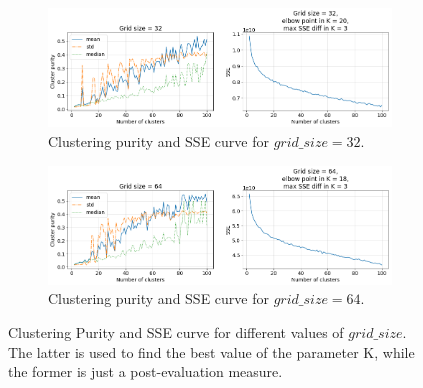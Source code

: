 \documentclass[12pt, twoside, a4paper]{report}
\begin{document}
\begin{figure}\ContinuedFloat
\begin{subfigure}[b]{\linewidth}
\includegraphics[width=\linewidth]{images/purity/32by32.png} 
\caption{Clustering purity and SSE curve for $grid\_size = 32$.}
\label{subfig:purity-32}
\end{subfigure}


\begin{subfigure}[b]{\linewidth}
\includegraphics[width=\linewidth]{images/purity/64by64.png} 
\caption{Clustering purity and SSE curve for $grid\_size = 64$.}
\label{subfig:purity-64}
\end{subfigure}
\caption{Clustering Purity and SSE curve for different values of $grid\_size$. The latter is used to find the best value of the parameter K, while the former is just a post-evaluation measure.}
\label{fig:purity}
\end{figure}
\end{document}
